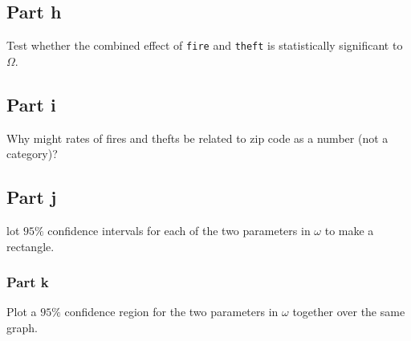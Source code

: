 \subsection{Part h}

\begin{question}
    Test whether the combined effect of \verb+fire+ and \verb+theft+ is statistically significant to $\Omega$.
\end{question}

\begin{answer}
    
\end{answer}

\subsection{Part i}

\begin{question}
    Why might rates of fires and thefts be related to zip code as a number (not a category)?
\end{question}

\begin{answer}
    
\end{answer}

\subsection{Part j}

\begin{question}
    lot $95\%$ confidence intervals for each of the two parameters in $\omega$ to make a rectangle.
\end{question}

\begin{answer}
    
\end{answer}

\subsubsection{Part k}

\begin{question}
    Plot a $95\%$ confidence region for the two parameters in $\omega$ together over the same graph.
\end{question}

\begin{answer}
    
\end{answer}